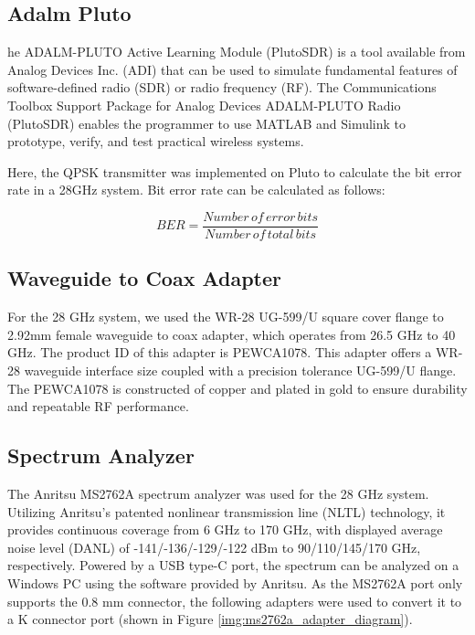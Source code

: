 \documentclass[a4paper,12pt]{report}
\begin{document}
\subsection{Adalm Pluto}

he ADALM-PLUTO Active Learning Module (PlutoSDR) is
a tool available from Analog Devices Inc. (ADI) that
can be used to simulate fundamental features of software-defined radio (SDR)
or radio frequency (RF).
The Communications Toolbox Support Package for Analog Devices ADALM-PLUTO
Radio (PlutoSDR) enables the programmer to use MATLAB and Simulink to prototype,
verify, and test practical wireless systems.

Here, the QPSK transmitter was implemented on Pluto to
calculate the bit error rate in a 28GHz system.
Bit error rate can be calculated as follows:

\begin{equation}
  BER = \frac{Number\, of\, error\, bits}{Number\, of\, total\, bits}
\end{equation}

\subsection{Waveguide to Coax Adapter}

For the 28 GHz system,
we used the WR-28 UG-599/U square cover flange to 2.92mm
female waveguide to coax adapter, 
which operates from 26.5 GHz to 40 GHz.
The product ID of this adapter is PEWCA1078.
This adapter offers a WR-28 waveguide interface size
coupled with a precision tolerance UG-599/U flange.
The PEWCA1078 is
constructed of copper and plated in gold to ensure
durability and repeatable RF performance.

\subsection{Spectrum Analyzer}

The Anritsu MS2762A spectrum analyzer was used for the
28 GHz system.
Utilizing Anritsu's patented nonlinear transmission line (NLTL) technology,
it provides continuous coverage from 6 GHz to 170 GHz,
with displayed average noise level (DANL) of
-141/-136/-129/-122 dBm to 90/110/145/170 GHz, respectively.
Powered by a USB type-C port,
the spectrum can be analyzed on a Windows PC
using the software provided by Anritsu.
As the MS2762A port only supports the 0.8 mm connector,
the following adapters were used to convert it to a K connector port
(shown in Figure \ref{img:ms2762a_adapter_diagram}).
\end{document}
